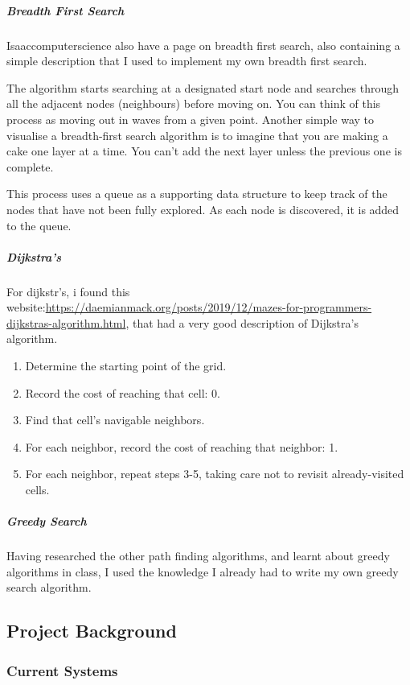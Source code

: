 \documentclass{article}
\begin{document}
\subparagraph*{Breadth First Search}
Isaaccomputerscience also have a page on breadth first search, also containing a simple description that I used to implement my own breadth first search.
\begin{quoting}
    The algorithm starts searching at a designated start node and searches through all the adjacent nodes (neighbours) before moving on. You can think of this process as moving out in waves from a given point. Another simple way to visualise a breadth-first search algorithm is to imagine that you are making a cake one layer at a time. You can't add the next layer unless the previous one is complete.

    This process uses a queue as a supporting data structure to keep track of the nodes that have not been fully explored. As each node is discovered, it is added to the queue.
\end{quoting} 

\subparagraph*{Dijkstra's}
For dijkstr's, i found this website:\url{https://daemianmack.org/posts/2019/12/mazes-for-programmers-dijkstras-algorithm.html}, that had a very good description of Dijkstra's algorithm. 
\begin{quoting}
    \begin{enumerate}
        \item Determine the starting point of the grid.
        \item Record the cost of reaching that cell: 0.
        \item Find that cell's navigable neighbors.
        \item For each neighbor, record the cost of reaching that neighbor: 1.
        \item For each neighbor, repeat steps 3-5, taking care not to revisit already-visited cells.
    \end{enumerate}
\end{quoting}

\subparagraph*{Greedy Search}
Having researched the other path finding algorithms, and learnt about greedy algorithms in class, I used the knowledge I already had to write my own greedy search algorithm.

\subsection{Project Background}
\subsubsection{Current Systems}
\end{document}
